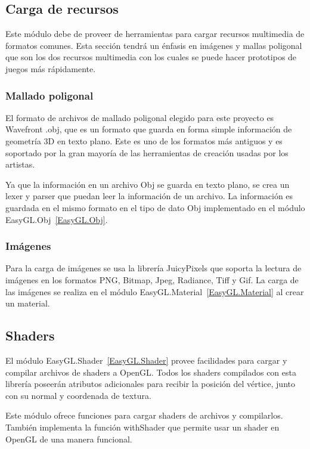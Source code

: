 \subsection{Carga de recursos}

Este módulo debe de proveer de herramientas para cargar recursos multimedia de formatos comunes. Esta sección tendrá un énfasis en imágenes y mallas poligonal que son los dos recursos multimedia con los cuales se puede hacer prototipos de juegos más rápidamente.

\subsubsection{Mallado poligonal}

El formato de archivos de mallado poligonal elegido para este proyecto es Wavefront .obj, que es un formato que guarda en forma simple información de geometría 3D en texto plano. Este es uno de los formatos más antiguos y es soportado por la gran mayoría de las herramientas de creación usadas por los artistas.

Ya que la información en un archivo Obj se guarda en texto plano, se crea un lexer y parser que puedan leer la información de un archivo. La información es guardada en el mismo formato en el tipo de dato Obj implementado en el módulo EasyGL.Obj~\ref{EasyGL.Obj}.

\subsubsection{Imágenes}

Para la carga de imágenes se usa la librería JuicyPixels \cite{libreria:JuicyPixels} que soporta la lectura de imágenes en los formatos PNG, Bitmap, Jpeg, Radiance, Tiff y Gif. La carga de las imágenes se realiza en el módulo EasyGL.Material~\ref{EasyGL.Material} al crear un material.

\subsection{Shaders}

El módulo EasyGL.Shader~\ref{EasyGL.Shader} provee facilidades para cargar y compilar archivos de shaders a OpenGL. Todos los shaders compilados con esta librería poseerán atributos adicionales para recibir la posición del vértice, junto con su normal y coordenada de textura.

Este módulo ofrece funciones para cargar shaders de archivos y compilarlos. También implementa la función withShader que permite usar un shader en OpenGL de una manera funcional.

